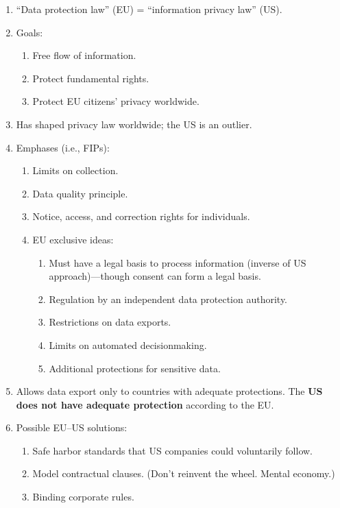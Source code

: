 \begin{enumerate}
    \item ``Data protection law'' (EU) = ``information privacy law'' (US).
    \item Goals:
    \begin{enumerate}
        \item Free flow of information.
        \item Protect fundamental rights.
        \item Protect EU citizens' privacy worldwide.
    \end{enumerate}
    \item Has shaped privacy law worldwide; the US is an outlier.
    \item Emphases (i.e., FIPs):
    \begin{enumerate}
        \item Limits on collection.
        \item Data quality principle.
        \item Notice, access, and correction rights for individuals.
        \item EU exclusive ideas:
        \begin{enumerate}
            \item Must have a legal basis to process information (inverse of US 
            approach)---though consent can form a legal basis.
            \item Regulation by an independent data protection authority.
            \item Restrictions on data exports.
            \item Limits on automated decisionmaking.
            \item Additional protections for sensitive data.
        \end{enumerate}
    \end{enumerate}
    \item Allows data export only to countries with adequate protections. The 
    \textbf{US does not have adequate protection} according to the EU.
    \item Possible EU--US solutions:
    \begin{enumerate}
        \item Safe harbor standards that US companies could voluntarily follow.
        \item Model contractual clauses. (Don't reinvent the wheel. Mental 
        economy.)
        \item Binding corporate rules.
    \end{enumerate}
\end{enumerate}
